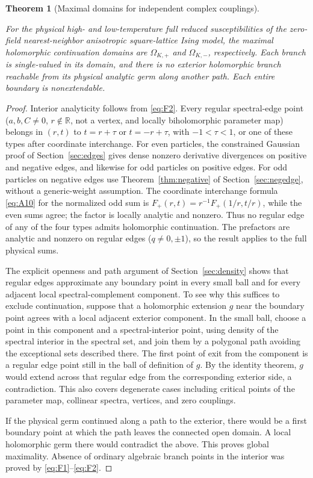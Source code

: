 \documentclass[11pt,a4paper]{article}
\numberwithin{equation}{section}
\theoremstyle{plain}
\newtheorem{theorem}{Theorem}[section]
\theoremstyle{definition}
\begin{document}
\begin{theorem}[Maximal domains for independent complex couplings]\label{thm:global}

For the physical high- and low-temperature full reduced susceptibilities of the zero-field nearest-neighbor anisotropic square-lattice Ising model, the maximal holomorphic continuation domains are \(\Omega_{K,+}\) and \(\Omega_{K,-}\), respectively. Each branch is single-valued in its domain, and there is no exterior holomorphic branch reachable from its physical analytic germ along another path. Each entire boundary is nonextendable.

\end{theorem}

\begin{proof}

Interior analyticity follows from \eqref{eq:F2}. Every regular spectral-edge point (\(a,b,C\ne0\), \(r\notin\mathbb R\), not a vertex, and locally biholomorphic parameter map) belongs in \((r,t)\) to \(t=r+\tau\) or \(t=-r+\tau\), with \(-1<\tau<1\), or one of these types after coordinate interchange. For even particles, the constrained Gaussian proof of Section~\ref{sec:edges} gives dense nonzero derivative divergences on positive and negative edges, and likewise for odd particles on positive edges. For odd particles on negative edges use Theorem~\ref{thm:negative} of Section~\ref{sec:negedge}, without a generic-weight assumption. The coordinate interchange formula \eqref{eq:A10} for the normalized odd sum is \(F_+(r,t)=r^{-1}F_+(1/r,t/r)\), while the even sums agree; the factor is locally analytic and nonzero. Thus no regular edge of any of the four types admits holomorphic continuation. The prefactors are analytic and nonzero on regular edges (\(q\ne0,\pm1\)), so the result applies to the full physical sums.

The explicit openness and path argument of Section~\ref{sec:density} shows that regular edges approximate any boundary point in every small ball and for every adjacent local spectral-complement component. To see why this suffices to exclude continuation, suppose that a holomorphic extension \(g\) near the boundary point agrees with a local adjacent exterior component. In the small ball, choose a point in this component and a spectral-interior point, using density of the spectral interior in the spectral set, and join them by a polygonal path avoiding the exceptional sets described there. The first point of exit from the component is a regular edge point still in the ball of definition of \(g\). By the identity theorem, \(g\) would extend across that regular edge from the corresponding exterior side, a contradiction. This also covers degenerate cases including critical points of the parameter map, collinear spectra, vertices, and zero couplings.

If the physical germ continued along a path to the exterior, there would be a first boundary point at which the path leaves the connected open domain. A local holomorphic germ there would contradict the above. This proves global maximality. Absence of ordinary algebraic branch points in the interior was proved by \eqref{eq:F1}--\eqref{eq:F2}.

\end{proof}
\end{document}

